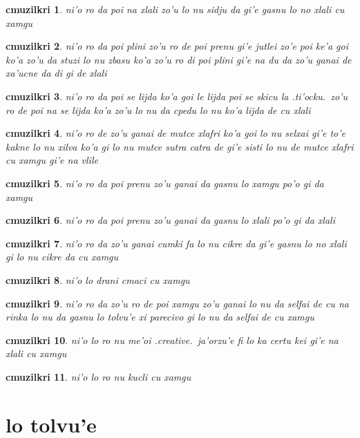 \documentclass{report}
\newtheorem{cmuzilkri}{cmuzilkri}
\begin{document}
\begin{cmuzilkri}
	ni'o ro da poi na xlali zo'u lo nu sidju da gi'e gasnu lo no xlali cu xamgu
\end{cmuzilkri}
\begin{cmuzilkri}
	ni'o ro da poi plini zo'u ro de poi prenu gi'e jutlei zo'e poi ke'a goi ko'a zo'u da stuzi lo nu zbasu ko'a zo'u ro di poi plini gi'e na du da zo'u ganai de xa'ucne da di gi de xlali
\end{cmuzilkri}
\begin{cmuzilkri}
	ni'o ro da poi se lijda ko'a goi le lijda poi se skicu la .ti'ocku.\ zo'u ro de poi na se lijda ko'a zo'u lo nu da cpedu lo nu ko'a lijda de cu xlali
\end{cmuzilkri}
\begin{cmuzilkri}
	ni'o ro de zo'u ganai de mutce xlafri ko'a goi lo nu selxai gi'e to'e kakne lo nu xilva ko'a gi lo nu mutce sutra catra de gi'e sisti lo nu de mutce xlafri cu xamgu gi'e na vlile
\end{cmuzilkri}
\begin{cmuzilkri}
	ni'o ro da poi prenu zo'u ganai da gasnu lo xamgu po'o gi da xamgu
\end{cmuzilkri}
\begin{cmuzilkri}
	ni'o ro da poi prenu zo'u ganai da gasnu lo xlali po'o gi da xlali
\end{cmuzilkri}
\begin{cmuzilkri}
	ni'o ro da zo'u ganai cumki fa lo nu cikre da gi'e gasnu lo no xlali gi lo nu cikre da cu xamgu
\end{cmuzilkri}
\begin{cmuzilkri}
	ni'o lo drani cmaci cu xamgu
\end{cmuzilkri}
\begin{cmuzilkri}
	ni'o ro da zo'u ro de poi xamgu zo'u ganai lo nu da selfai de cu na rinka lo nu da gasnu lo tolvu'e xi parecivo gi lo nu da selfai de cu xamgu
\end{cmuzilkri}
\begin{cmuzilkri}
	ni'o lo ro nu me'oi .creative.\ ja'orzu'e fi lo ka certu kei gi'e na xlali cu xamgu
\end{cmuzilkri}
\begin{cmuzilkri}
	ni'o lo ro nu kucli cu xamgu
\end{cmuzilkri}

\section{lo tolvu'e}
\end{document}
